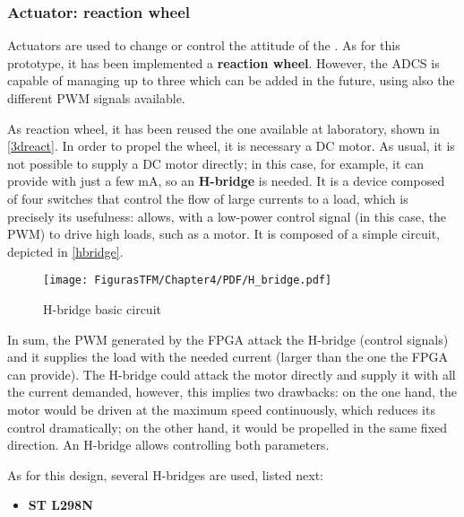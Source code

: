 \subsubsection{Actuator: reaction wheel}

Actuators are used to change or control the attitude of the . As for this prototype, it has been implemented a \textbf{reaction wheel}. However, the \acrshort{ADCS} is capable of managing up to three  which can be added in the future, using also the different \acrshort{PWM} signals available. 

As reaction wheel, it has been reused the one available at  laboratory, shown in \autoref{3dreact}. In order to propel the wheel, it is necessary a DC motor. As usual, it is not possible to supply a DC motor directly; in this case, for example, it can provide with just a few mA, so an \textbf{H-bridge} is needed. It is a device composed of four switches that control the flow of large currents to a load, which is precisely its usefulness: allows, with a low-power control signal (in this case, the \acrshort{PWM}) to drive high loads, such as a motor. It is composed of a simple circuit, depicted in \autoref{hbridge}.

		\begin{figure} [H]
			\centering
			\texttt{[image: FigurasTFM/Chapter4/PDF/H\_bridge.pdf]}
			\caption{H-bridge basic circuit \cite{wiki}}      		\label{hbridge}
\end{figure}

In sum, the \acrshort{PWM} generated by the \acrshort{FPGA} attack the H-bridge (control signals) and it supplies the load with the needed current (larger than the one the \acrshort{FPGA} can provide). The H-bridge could attack the motor directly and supply it with all the current demanded, however, this implies two drawbacks: on the one hand, the motor would be driven at the maximum speed continuously, which reduces its control dramatically; on the other hand, it would be propelled in the same fixed direction. An H-bridge allows controlling both parameters.

As for this design, several H-bridges are used, listed next:

\begin{itemize} [noitemsep,topsep=0pt]
\item\textbf{ ST L298N}
\end{itemize}

